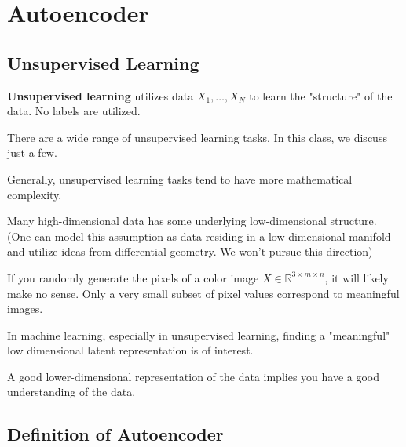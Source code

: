 \chapter{Autoencoder}

\section{Unsupervised Learning}

\begin{definition}
    \textbf{Unsupervised learning} utilizes data $X_{1}, \ldots, X_{N}$ to learn the "structure" of the data. No labels are utilized.

    There are a wide range of unsupervised learning tasks. In this class, we discuss just a few.

    Generally, unsupervised learning tasks tend to have more mathematical complexity.
\end{definition}

\begin{concept}
    Many high-dimensional data has some underlying low-dimensional structure.
    (One can model this assumption as data residing in a low dimensional manifold and utilize ideas from differential geometry. We won’t pursue this direction)

    If you randomly generate the pixels of a color image $X \in \mathbb{R}^{3 \times m \times n}$, it will likely make no sense. Only a very small subset of pixel values correspond to meaningful images.

    In machine learning, especially in unsupervised learning, finding a "meaningful" low dimensional latent representation is of interest.

    A good lower-dimensional representation of the data implies you have a good understanding of the data.
\end{concept}

\section{Definition of Autoencoder}

